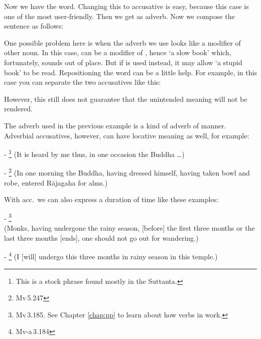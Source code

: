 Now we have the word. Changing this to accusative is easy, because this case is one of the most user-friendly. Then we get  as adverb. Now we compose the sentence as follows:


One possible problem here is when the adverb we use looks like a modifier of other noun. In this case,  can be a modifier of , hence `a slow book' which, fortunately, sounds out of place. But if  is used instead, it may allow `a stupid book' to be read. Repositioning the word can be a little help. For example, in this case you can separate the two accusatives like this:


However, this still does not guarantee that the unintended meaning will not be rendered.

The adverb used in the previous example is a kind of adverb of manner. Adverbial accusatives, however, can have locative meaning as well, for example:\par
- \footnote{This is a stock phrase found mostly in the Suttanta.} (It is heard by me thus, in one occasion the Buddha \ldots)\par
- \footnote{Mv\,5.247} (In one morning the Buddha, having dressed himself, having taken bowl and robe, entered R\=ajagaha for alms.)\par

\bigskip
With acc.\ we can also express a duration of time like these examples:\par
- \footnote{Mv\,3.185. See Chapter \ref{chap:pp} to learn about how verbs in  work.} \\(Monks, having undergone the rainy season, [before] the first three months or the last three months [ends], one should not go out for wandering.)\par
- \footnote{Mv-a\,3.184} (I [will] undergo this three months in rainy season in this temple.)\par

